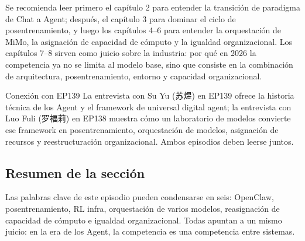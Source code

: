 Se recomienda leer primero el capítulo 2 para entender la transición de paradigma de Chat a Agent; después, el capítulo 3 para dominar el ciclo de posentrenamiento, y luego los capítulos 4--6 para entender la orquestación de MiMo, la asignación de capacidad de cómputo y la igualdad organizacional. Los capítulos 7--8 sirven como juicio sobre la industria: por qué en 2026 la competencia ya no se limita al modelo base, sino que consiste en la combinación de arquitectura, posentrenamiento, entorno y capacidad organizacional.

\begin{knowledgebox}{Conexión con EP139}
La entrevista con Su Yu (苏煜) en EP139 ofrece la historia técnica de los Agent y el framework de universal digital agent; la entrevista con Luo Fuli (罗福莉) en EP138 muestra cómo un laboratorio de modelos convierte ese framework en posentrenamiento, orquestación de modelos, asignación de recursos y reestructuración organizacional. Ambos episodios deben leerse juntos.
\end{knowledgebox}

\subsection{Resumen de la sección}

Las palabras clave de este episodio pueden condensarse en seis: OpenClaw, posentrenamiento, RL infra, orquestación de varios modelos, reasignación de capacidad de cómputo e igualdad organizacional. Todas apuntan a un mismo juicio: en la era de los Agent, la competencia es una competencia entre sistemas.

